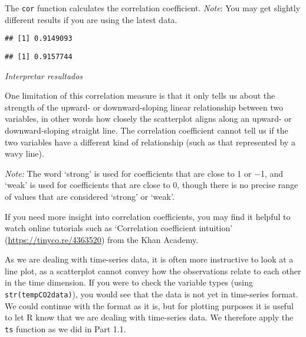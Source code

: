 \documentclass[
]{article}
\newenvironment{Shaded}{\begin{snugshade}}{\end{snugshade}}
\newcommand{\FunctionTok}[1]{\textcolor[rgb]{0.13,0.29,0.53}{\textbf{#1}}}
\newcommand{\NormalTok}[1]{#1}
\newcommand{\SpecialCharTok}[1]{\textcolor[rgb]{0.81,0.36,0.00}{\textbf{#1}}}
\begin{document}
The \texttt{cor} function calculates the correlation coefficient.
\emph{Note}: You may get slightly different results if you are using the
latest data.

\begin{Shaded}
\end{Shaded}

\begin{verbatim}
## [1] 0.9149093
\end{verbatim}

\begin{verbatim}
## [1] 0.9157744
\end{verbatim}

\emph{Interpretar resultados}

One limitation of this correlation measure is that it only tells us
about the strength of the upward- or downward-sloping linear
relationship between two variables, in other words how closely the
scatterplot aligns along an upward- or downward-sloping straight line.
The correlation coefficient cannot tell us if the two variables have a
different kind of relationship (such as that represented by a wavy
line).

\emph{Note:} The word `strong' is used for coefficients that are close
to 1 or −1, and `weak' is used for coefficients that are close to 0,
though there is no precise range of values that are considered `strong'
or `weak'.

If you need more insight into correlation coefficients, you may find it
helpful to watch online tutorials such as `Correlation coefficient
intuition' (\url{https://tinyco.re/4363520}) from the Khan Academy.

As we are dealing with time-series data, it is often more instructive to
look at a line plot, as a scatterplot cannot convey how the observations
relate to each other in the time dimension. If you were to check the
variable types (using \texttt{str(tempCO2data)}), you would see that the
data is not yet in time-series format. We could continue with the format
as it is, but for plotting purposes it is useful to let R know that we
are dealing with time-series data. We therefore apply the \texttt{ts}
function as we did in Part 1.1.
\end{document}
